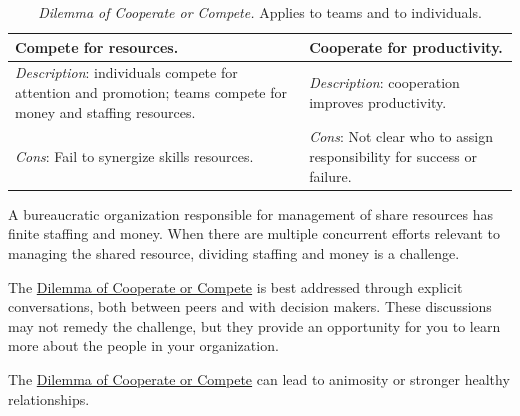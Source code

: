 \begin{center}
\begin{table}[H] %
\begin{tabular}{ | m{\dilemmatablewidth}| m{\dilemmatablewidth} | } 
  \hline
  \textbf{Compete for resources.} &
  \textbf{Cooperate for productivity.} \\
  \hline
  \textit{Description}: individuals compete for attention and promotion; teams compete for money and staffing resources. &
  \textit{Description}: cooperation improves productivity. \\  
  \hline
  \textit{Cons}: Fail to synergize skills resources. & 
  \textit{Cons}: Not clear who to assign responsibility for success or failure. \\
  \hline
\end{tabular}
\caption{
\textit{Dilemma of Cooperate or Compete.} 
Applies to teams and to individuals. 
}
\label{table:dilemma-personal-cooperate-vs-compete}
\end{table}
\end{center}


A bureaucratic organization responsible for management of share resources has finite staffing and money. When there are multiple concurrent efforts relevant to managing the shared resource,  dividing staffing and money is a challenge. 

The \hyperref[table:dilemma-personal-cooperate-vs-compete]{Dilemma of Cooperate or Compete} is best addressed through explicit conversations, both between peers and with decision makers. These discussions may not remedy the challenge, but they provide an opportunity for you to learn more about the people in your organization.

The \hyperref[table:dilemma-personal-cooperate-vs-compete]{Dilemma of Cooperate or Compete} can lead to animosity or stronger healthy relationships. 



